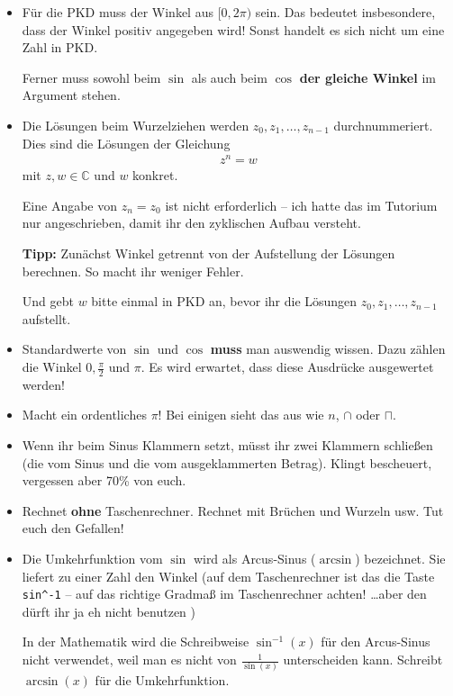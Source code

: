 \documentclass[11pt, a4paper]{article}
\newcommand{\C}{\mathbb{C}}
\begin{document}
\begin{itemize}
\item Für die PKD muss der Winkel aus $[0, 2\pi)$ sein. Das bedeutet insbesondere, dass der Winkel positiv angegeben wird! Sonst handelt es sich nicht um eine Zahl in PKD.

Ferner muss sowohl beim $\sin$ als auch beim $\cos$ \textbf{der gleiche Winkel} im Argument stehen.

\item Die Lösungen beim Wurzelziehen werden $z_0, z_1, \dots, z_{n-1}$ durchnummeriert. Dies sind die Lösungen der Gleichung
\begin{align*}
z^n = w
\end{align*}
mit $z, w \in \C$ und $w$ konkret. 

Eine Angabe von $z_n = z_0$ ist nicht erforderlich -- ich hatte das im Tutorium nur angeschrieben, damit ihr den zyklischen Aufbau versteht. 

\textbf{Tipp:} Zunächst Winkel getrennt von der Aufstellung der Lösungen berechnen. So macht ihr weniger Fehler.

Und gebt $w$ bitte einmal in PKD an, bevor ihr die Lösungen $z_0, z_1, \dots, z_{n-1}$ aufstellt. 


\item Standardwerte von $\sin$ und $\cos$ \textbf{muss} man auswendig wissen. Dazu zählen die Winkel $0, \frac{\pi}{2}$ und $\pi$. Es wird erwartet, dass diese Ausdrücke ausgewertet werden!

\item Macht ein ordentliches $\pi$! Bei einigen sieht das aus wie $n$, $\cap$ oder $\sqcap$.

\item Wenn ihr beim Sinus Klammern setzt, müsst ihr zwei Klammern schließen (die vom Sinus und die vom ausgeklammerten Betrag). Klingt bescheuert, vergessen aber 70\% von euch.

\item Rechnet \textbf{ohne} Taschenrechner. Rechnet mit Brüchen und Wurzeln usw. Tut euch den Gefallen!

\item Die Umkehrfunktion vom $\sin$ wird als Arcus-Sinus ($\arcsin$) bezeichnet. Sie liefert zu einer Zahl den Winkel (auf dem Taschenrechner ist das die Taste \texttt{sin\textasciicircum-1} -- auf das richtige Gradmaß im Taschenrechner achten! \dots aber den dürft ihr ja eh nicht benutzen \smiley{})

In der Mathematik wird die Schreibweise $\sin^{-1}(x)$ für den Arcus-Sinus nicht verwendet, weil man es nicht von $\frac{1}{\sin(x)}$ unterscheiden kann. Schreibt $\arcsin(x)$ für die Umkehrfunktion.


\end{itemize}
\end{document}
